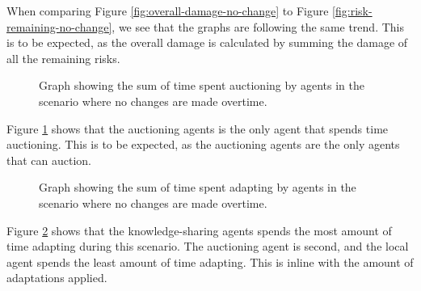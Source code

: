 When comparing Figure \ref{fig:overall-damage-no-change} to Figure \ref{fig:risk-remaining-no-change}, we see that the graphs are following the same trend. This is to be expected, as the overall damage is calculated by summing the damage of all the remaining risks.

\begin{figure}[H]
    \hspace*{-1cm}
    \centering
        
    \caption{Graph showing the sum of time spent auctioning by agents in the scenario where no changes are made overtime.}
    \label{fig:auctioning-time-no-change}
\end{figure}

Figure \ref{fig:auctioning-time-no-change} shows that the auctioning agents is the only agent that spends time auctioning. This is to be expected, as the auctioning agents are the only agents that can auction.

\begin{figure}[H]
    \hspace*{-1cm}
    \centering
        
    \caption{Graph showing the sum of time spent adapting by agents in the scenario where no changes are made overtime.}
    \label{fig:adapting-time-no-change}
\end{figure}

Figure \ref{fig:adapting-time-no-change} shows that the knowledge-sharing agents spends the most amount of time adapting during this scenario. The auctioning agent is second, and the local agent spends the least amount of time adapting. This is inline with the amount of adaptations applied.
